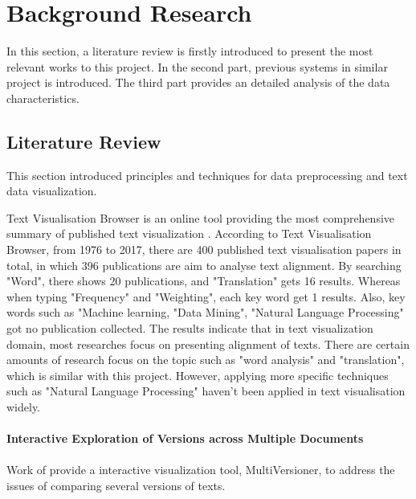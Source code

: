 \clearpage
\section{Background Research}

In this section, a literature review is firstly introduced to present the most relevant works to this project. In the second part, previous systems in similar project is introduced. The third part provides an detailed analysis of the data characteristics.

\subsection{Literature Review}
This section introduced principles and techniques for data preprocessing and text data visualization.

Text Visualisation Browser \cite{Kucher2014} is an online tool providing the most comprehensive summary of published text visualization \cite{Cao2016}. According to Text Visualisation Browser, from 1976 to 2017, there are 400 published text visualisation papers in total, in which 396 publications are aim to analyse text alignment. By searching "Word", there shows 20 publications, and "Translation" gets 16 results. Whereas when typing "Frequency" and "Weighting", each key word get 1 results. Also, key words such as "Machine learning, "Data Mining", "Natural Language Processing" got no publication collected. The results indicate that in text visualization domain, most researches focus on presenting alignment of texts. There are certain amounts of research focus on the topic such as "word analysis" and "translation", which is similar with this project. However, applying more specific techniques such as "Natural Language Processing" haven't been applied in text visualisation widely.


\paragraph{Interactive Exploration of Versions across Multiple Documents}

\paragraph[]{}Work of \cite{Jong2008} provide a interactive visualization tool, MultiVersioner, to address the issues of comparing several versions of texts.

